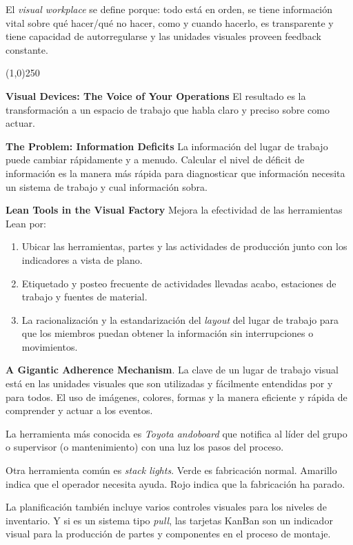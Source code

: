 \documentclass[]{article}
\begin{document}
El \textit{visual workplace} se define porque: todo está en orden, se tiene información vital sobre qué hacer/qué no hacer, como y cuando hacerlo, es transparente y tiene capacidad de autorregularse y las unidades visuales proveen feedback constante.

\begin{center}
	\line(1,0){250}
\end{center}


\textbf{Visual Devices: The Voice of Your Operations} El resultado es la transformación a un espacio de trabajo que habla claro y preciso sobre como actuar.

\textbf{The Problem: Information Deficits} La información del lugar de trabajo puede cambiar rápidamente y a menudo. Calcular el nivel de déficit de información es la manera más rápida para diagnosticar que información necesita un sistema de trabajo y cual información sobra.

\textbf{Lean Tools in the Visual Factory} Mejora la efectividad de las herramientas Lean por:

\begin{enumerate}
\item Ubicar las herramientas, partes y las actividades de producción junto con los indicadores a vista de plano.
\item Etiquetado y posteo frecuente de actividades llevadas acabo, estaciones de trabajo y fuentes de material.
\item La racionalización y la estandarización del \textit{layout} del lugar de trabajo para que los miembros puedan obtener la información sin interrupciones o movimientos.
\end{enumerate}

\textbf{A Gigantic Adherence Mechanism}. La clave de un lugar de trabajo visual está en las unidades visuales que son utilizadas y fácilmente entendidas por y para todos. El uso de imágenes, colores, formas y la manera eficiente y rápida de comprender y actuar a los eventos.

La herramienta más conocida es \textit{Toyota andoboard} que notifica al líder del grupo o supervisor (o mantenimiento) con una luz los pasos del proceso.

Otra herramienta común es \textit{stack lights}. Verde es fabricación normal. Amarillo indica que el operador necesita ayuda. Rojo indica que la fabricación ha parado.

La planificación también incluye varios controles visuales para los niveles de inventario. Y si es un sistema tipo \textit{pull}, las tarjetas KanBan son un indicador visual para la producción de partes y componentes en el proceso de montaje.



\end{document}

